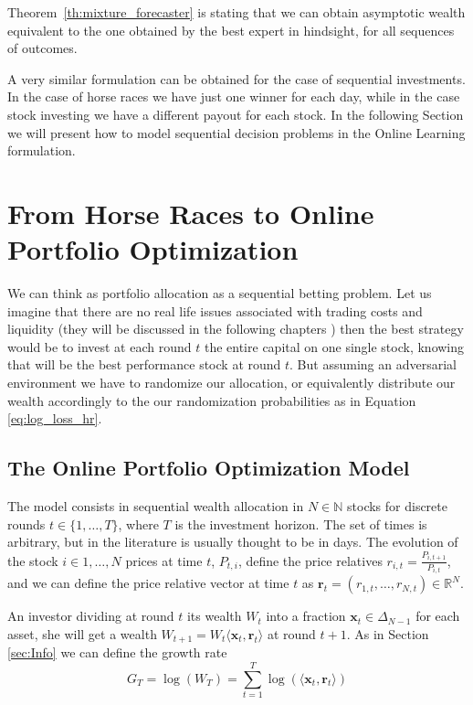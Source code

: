 Theorem~\ref{th:mixture_forecaster} is stating that we can obtain asymptotic wealth equivalent to the one obtained by the best expert in hindsight, for all sequences of outcomes. 

A very similar formulation can be obtained for the case of sequential investments. In the case of horse races we have just one winner for each day, while in the case stock investing we have a different payout for each stock. In the following Section we will present how to model sequential decision problems in the Online Learning formulation.

\section{From Horse Races to Online Portfolio Optimization}

We can think as portfolio allocation as a sequential betting problem. Let us imagine that there are no real life issues associated with trading costs and liquidity (they will be discussed in the following chapters ) then the best strategy would be to invest at each round $t$ the entire capital on one single stock, knowing that will be the best performance stock at round $t$. But assuming an adversarial environment we have to randomize our allocation, or equivalently distribute our wealth accordingly to the our randomization probabilities as in Equation \eqref{eq:log_loss_hr}. 

\subsection{The Online Portfolio Optimization Model}

The model consists in sequential wealth allocation in $N\in\mathbb N$ stocks for discrete rounds $t\in\{1,\ldots,T\}$, where $T$ is the investment horizon. The set of times is arbitrary, but in the literature is usually thought to be in days. The evolution of the stock $i\in 1,\ldots,N$ prices at time $t$, $P_{t,i}$, define the price relatives $r_{i,t}=\frac{P_{i,t+1}}{P_{i,t}}$, and we can define the price relative vector at time $t$ as $\mathbf r_t=(r_{1,t},\ldots,r_{N,t})\in\mathbb R^N$. 

An investor dividing at round $t$ its wealth $W_t$ into a fraction $\mathbf x_t\in\Delta_{N-1}$ for each asset, she will get a wealth $W_{t+1}=W_t\langle \mathbf x_t,\mathbf r_t\rangle$ at round $t+1$. As in Section \ref{sec:Info} we can define the growth rate 
$$G_T=\log(W_T)=\sum\limits_{t=1}^T\log(\langle\mathbf x_t, \mathbf r_t\rangle)$$

